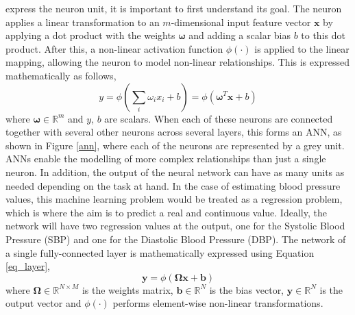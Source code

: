  express the neuron unit, it is important to first understand its goal. The neuron
 applies a linear transformation to an $m$-dimensional input feature
vector $\mathbf{x}$ by applying a dot product with the weights $\bm{\omega}$ and 
adding a scalar bias $b$ to this dot product. After this, a non-linear 
activation function $\phi(\cdot)$ is applied to the linear mapping, allowing the 
neuron to model non-linear relationships. This is expressed mathematically as follows,
\begin{equation}\label{eq_neuron}
    y = \phi(\sum_{i} \omega_i x_i + b ) = \phi (\bm{\omega}^T \mathbf{x} + b)
\end{equation}\noindent where $\bm{\omega} \in \mathbb{R}^m$ 
and $y$, $b$ are scalars. When each of these neurons are connected together with several other 
neurons across several layers, this forms an ANN, as shown in Figure \ref{ann}, where each of the 
neurons are represented by a grey unit. ANNs enable the modelling of more 
complex relationships than just a single neuron. In addition,
the output of the neural network can have as many units as needed depending on the task
at hand. In the case of estimating blood pressure values, this machine learning problem would be treated 
as a regression problem, which is where the aim is to predict a real and continuous value. Ideally, the network will have two regression values 
at the output, one for the Systolic Blood Pressure (SBP) and one for the Diastolic Blood Pressure (DBP). The network of a single fully-connected layer is mathematically expressed using Equation \ref{eq_layer}, 
\begin{equation}\label{eq_layer}
    \mathbf{y} = \phi (\bm{\Omega} \mathbf{x} + \mathbf{b})
\end{equation}\noindent where $\bm{\Omega} \in \mathbb{R}^{N \times M}$ is the weights matrix, 
$\mathbf{b} \in \mathbb{R}^N$ is the bias vector, $\mathbf{y} \in \mathbb{R}^N$ is the output 
vector and $\phi(\cdot)$ performs element-wise non-linear transformations.

